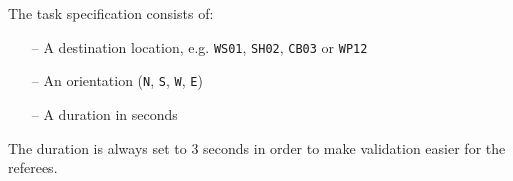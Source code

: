 The task specification consists of:

\begin{itemize}
	\item[--] A destination location, e.g. \texttt{WS01}, \texttt{SH02}, \texttt{CB03} or \texttt{WP12}
	\item[--] An orientation (\texttt{N}, \texttt{S}, \texttt{W}, \texttt{E})
	\item[--] A duration in seconds
\end{itemize}

The duration is always set to 3 seconds in order to make validation easier for the referees.
%
%
%
%
%
%
%
%
%
